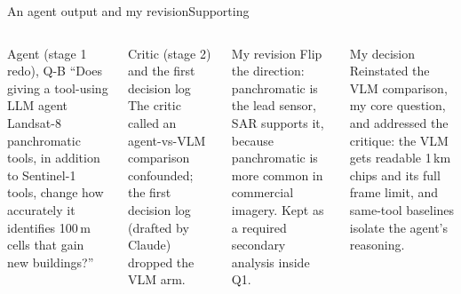 \documentclass[aspectratio=169,11pt]{beamer}
\begin{document}
\begin{frame}[shrink=14]{An agent output and my revision}{Supporting}
\small
\begin{columns}[T,onlytextwidth]
\begin{block}{Agent (stage 1 redo), Q-B}
\footnotesize ``Does giving a tool-using LLM agent Landsat-8 panchromatic tools, in addition to Sentinel-1 tools, change how accurately it identifies 100\,m cells that gain new buildings?''
\end{block}
\begin{block}{Critic (stage 2) and the first decision log}
\footnotesize The critic called an agent-vs-VLM comparison confounded; the first decision log (drafted by Claude) dropped the VLM arm.
\end{block}
\begin{block}{My revision}
\footnotesize Flip the direction: \alert{panchromatic is the lead sensor, SAR supports it}, because panchromatic is more common in commercial imagery. Kept as a required secondary analysis inside Q1.
\end{block}
\begin{block}{My decision}
\footnotesize Reinstated the VLM comparison, my core question, and addressed the critique: the VLM gets readable 1\,km chips and its full frame limit, and same-tool baselines isolate the agent's reasoning.
\end{block}
\end{columns}
\end{frame}
\end{document}
